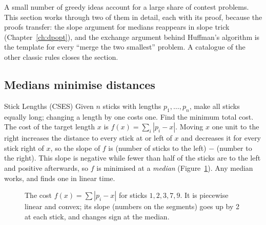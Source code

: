 A small number of greedy ideas account for a large share of contest problems. This section works through two of them in
detail, each with its proof, because the proofs transfer: the slope argument for medians reappears in slope trick
(Chapter~\ref{ch:dpopt}), and the exchange argument behind Huffman's algorithm is the template for every ``merge the two
smallest'' problem. A catalogue of the other classic rules closes the section.

\subsection{Medians minimise distances}

\begin{problem}{Stick Lengths (CSES)}
Given $n$ sticks with lengths $p_1, \ldots, p_n$, make all sticks equally long; changing a length by one costs one. Find the
minimum total cost.
\solution The cost of the target length $x$ is $f(x) = \sum_i |p_i - x|$. Moving $x$ one unit to the right increases the
distance to every stick at or left of $x$ and decreases it for every stick right of $x$, so the slope of $f$ is (number of
sticks to the left) $-$ (number to the right). This slope is negative while fewer than half of the sticks are to the left and
positive afterwards, so $f$ is minimised at a \emph{median} (Figure~\ref{fig:sticks}). Any median works, and
 finds one in linear time.
\end{problem}

\begin{figure}[htbp]
\centering
{}
\caption{The cost $f(x) = \sum |p_i - x|$ for sticks $1, 2, 3, 7, 9$. It is piecewise linear and convex; its slope (numbers
on the segments) goes up by 2 at each stick, and changes sign at the median.}
\label{fig:sticks}
\end{figure}

